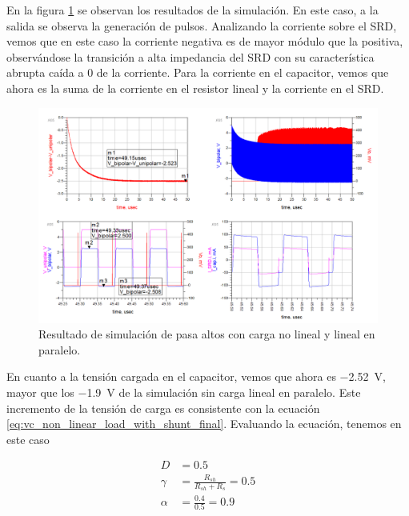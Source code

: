 En la figura \ref{fig:highpass_non_linear_w_shunt_simulation_result} se observan
los resultados de la simulación. En este caso, a la salida se observa la
generación de pulsos. Analizando la corriente sobre el SRD, vemos que en este
caso la corriente negativa es de mayor módulo que la positiva, observándose la
transición a alta impedancia del SRD con su característica abrupta caída a $0$
de la corriente. Para la corriente en el capacitor, vemos que ahora es la suma
de la corriente en el resistor lineal y la corriente en el SRD.

\begin{figure}[tbp]
    \centering
    \includegraphics[width=\textwidth]{images/highpass_nonlinear_w_shunt_sim_result.png}
    \caption{Resultado de simulación de pasa altos con carga no lineal y lineal
    en paralelo.}
    \label{fig:highpass_non_linear_w_shunt_simulation_result}
\end{figure}

En cuanto a la tensión cargada en el capacitor, vemos que ahora es
\qty{-2.52}{\volt}, mayor que los \qty{-1.9}{\volt} de la simulación sin carga
lineal en paralelo. Este incremento de la tensión de carga es consistente con la
ecuación \ref{eq:vc_non_linear_load_with_shunt_final}. Evaluando la ecuación,
tenemos en este caso

\begin{equation}
    \begin{aligned}
        D &= 0.5 \\
        \gamma &= \frac{R_{sh}}{R_{sh}+R_{s}} =0.5 \\
        \alpha &= \frac{0.4}{0.5} = 0.9 \\
    \end{aligned}
\end{equation}

